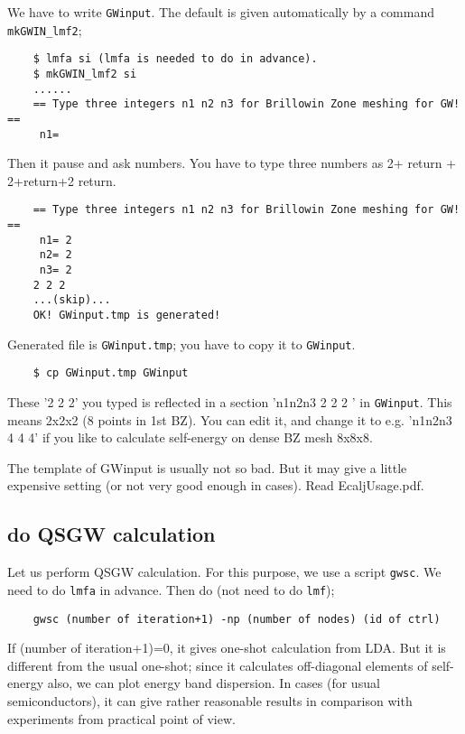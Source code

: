 \documentclass[a4paper,10pt,epsf,fleqn]{article}
\begin{document}
We have to write \verb+GWinput+. The default is given automatically by a
command \verb+mkGWIN_lmf2+;
\begin{verbatim}
    $ lmfa si (lmfa is needed to do in advance).
    $ mkGWIN_lmf2 si
    ......
    == Type three integers n1 n2 n3 for Brillowin Zone meshing for GW! ==
     n1=
\end{verbatim}
Then it pause and ask numbers. You have to type three numbers as
2+ return + 2+return+2 return.
\begin{verbatim}
    == Type three integers n1 n2 n3 for Brillowin Zone meshing for GW! ==
     n1= 2
     n2= 2
     n3= 2
    2 2 2
    ...(skip)...
    OK! GWinput.tmp is generated!
\end{verbatim}
Generated file is \verb+GWinput.tmp+; you have to copy it to \verb+GWinput+.
\begin{verbatim}
    $ cp GWinput.tmp GWinput
\end{verbatim}
These '2 2 2' you typed is reflected in a section 'n1n2n3 2 2 2 ' in
\verb+GWinput+. This means 2x2x2 (8 points in 1st BZ). 
You can edit it, and change it to e.g. 'n1n2n3 4 4 4' if you like to
calculate self-energy on dense BZ mesh 8x8x8. 

The template of GWinput is usually not so bad. But 
it may give a little expensive setting (or not very good enough in cases).
Read EcaljUsage.pdf.


\subsection{do QSGW calculation}
\label{fpgw-calc}
Let us perform QSGW calculation. 
For this purpose, we use a script \verb+gwsc+. 
We need to do \verb+lmfa+ in advance. Then do (not need to do \verb+lmf+);
\begin{verbatim}
    gwsc (number of iteration+1) -np (number of nodes) (id of ctrl)
\end{verbatim}
If (number of iteration+1)=0, it gives one-shot calculation from LDA.
But it is different from the usual one-shot;
since it calculates off-diagonal elements of self-energy also,
we can plot energy band dispersion. In cases (for usual
semiconductors), it can give rather reasonable results in comparison with
experiments from practical point of view.
\end{document}
